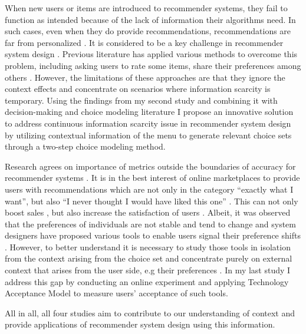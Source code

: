 \documentclass[a4paper,12pt]{article}
\begin{document}
When new users or items are introduced to recommender systems, they fail to function as intended because of the lack of information their algorithms need. In such cases, even when they do provide recommendations, recommendations are far from personalized \citep{lika2014facing}. It is considered to be a key challenge in recommender system design \citep{park2009pairwise}. Previous literature has applied various methods to overcome this problem, including asking users to rate some items, share their preferences among others \citep{guy2009personalized, aharon2013off, bykau2013coping, saveski2014item}. However, the limitations of these approaches are that they ignore the context effects and concentrate on scenarios where information scarcity is temporary. Using the findings from my second study and combining it with decision-making and choice modeling literature I propose an innovative solution to address continuous information scarcity issue in recommender system design by utilizing contextual information of the menu to generate relevant choice sets through a two-step choice modeling method.

Research agrees on importance of metrics outside the boundaries of accuracy for recommender systems \citep{kaminskas2016diversity}. It is in the best interest of online marketplaces to provide users with recommendations which are not only in the category ``exactly what I want'', but also ``I never thought I would have liked this one'' \citep{kotkovSurveySerendipityRecommender2016}. This can not only boost sales \citep{songWhenHowDiversify2019}, but also increase the satisfaction of users \citep{knijnenburgExplainingUserExperience2012}. Albeit, it was observed that the preferences of individuals are not stable and tend to change and system designers have proposed various tools to enable users signal their preference shifts \citep{bostandjiev2012tasteweights,hijikata2012relation}. However, to better understand it is necessary to study those tools in isolation from the context arising from the choice set and concentrate purely on external context that arises from the user side, e.g their preferences \citep{adomavicius2011context}. In my last study I address this gap by conducting an online experiment and applying Technology Acceptance Model \citep{davis1985technology} to measure users' acceptance of such tools.

All in all, all four studies aim to contribute to our understanding of context and provide applications of recommender system design using this information.
\end{document}
